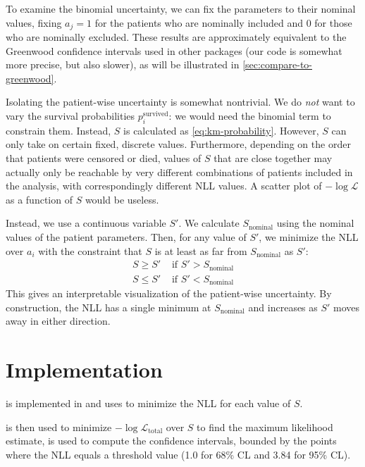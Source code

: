 \documentclass[article]{jss}
\begin{document}
To examine the binomial uncertainty, we can fix the parameters to their nominal values, fixing \(a_j=1\) for the patients who are nominally included and \(0\) for those who are nominally excluded.  These results are approximately equivalent to the Greenwood confidence intervals used in other packages (our code is somewhat more precise, but also slower), as will be illustrated in \cref{sec:compare-to-greenwood}.

Isolating the patient-wise uncertainty is somewhat nontrivial.  We do \emph{not} want to vary the survival probabilities \(p_i^\text{survived}\): we would need the binomial term to constrain them.  Instead, \(S\) is calculated as \cref{eq:km-probability}.  However, \(S\) can only take on certain fixed, discrete values.  Furthermore, depending on the order that patients were censored or died, values of \(S\) that are close together may actually only be reachable by very different combinations of patients included in the analysis, with correspondingly different NLL values.  A scatter plot of \(-\log\mathcal{L}\) as a function of \(S\) would be useless.

Instead, we use a continuous variable \(S'\).  We calculate \(S_\text{nominal}\) using the nominal values of the patient parameters.  Then, for any value of \(S'\), we minimize the NLL over \(a_i\) with the constraint that \(S\) is at least as far from \(S_\text{nominal}\) as \(S'\):
\begin{align}
S \ge S' & \text{ if } S' > S_\text{nominal} \\
S \le S' & \text{ if } S' < S_\text{nominal}
\end{align}
This gives an interpretable visualization of the patient-wise uncertainty.  By construction, the NLL has a single minimum at \(S_\text{nominal}\) and increases as \(S'\) moves away in either direction.

\section{Implementation}

 is implemented in  and uses  \citep{gurobi} to minimize the NLL for each value of \(S\).

 \citep{differential-evolution,scipy} is then used to minimize \(-\log \mathcal{L}_{\text{total}}\) over \(S\) to find the maximum likelihood estimate,   \citep{brentq,scipy} is used to compute the confidence intervals, bounded by the points where the NLL equals a threshold value (1.0 for 68\% CL and 3.84 for 95\% CL).
\end{document}

